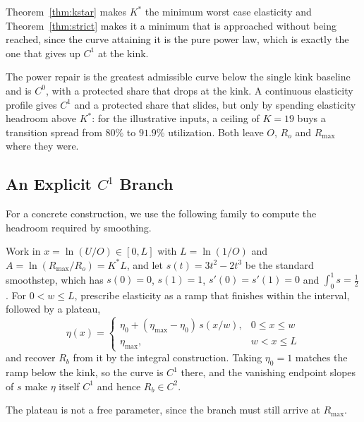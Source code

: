 \documentclass[11pt,a4paper]{article}
\begin{document}
Theorem~\ref{thm:kstar} makes $K^*$ the minimum worst case elasticity and Theorem~\ref{thm:strict} makes it a minimum that is approached without being reached, since the curve attaining it is the pure power law, which is exactly the one that gives up $C^1$ at the kink.

The power repair is the greatest admissible curve below the single kink baseline and is $C^0$, with a protected share that drops at the kink. A continuous elasticity profile gives $C^1$ and a protected share that slides, but only by spending elasticity headroom above $K^*$: for the illustrative inputs, a ceiling of $K=19$ buys a transition spread from $80\%$ to $91.9\%$ utilization. Both leave $O$, $R_o$ and $R_{\max}$ where they were.

\subsection{An Explicit \texorpdfstring{$C^1$}{C1} Branch}
\label{app:smoothstep}

For a concrete construction, we use the following family to compute the headroom required by smoothing.

Work in $x=\ln(U/O)\in[0,L]$ with $L=\ln(1/O)$ and $A=\ln(R_{\max}/R_o)=K^*L$, and let $s(t)=3t^2-2t^3$ be the standard smoothstep, which has $s(0)=0$, $s(1)=1$, $s'(0)=s'(1)=0$ and $\int_0^1 s=\tfrac12$. For $0<w\leq L$, prescribe elasticity as a ramp that finishes within the interval, followed by a plateau,
\begin{equation}
\boxed{
\eta(x)=
\begin{cases}
\eta_0+(\eta_{\max}-\eta_0)\,s(x/w), & 0\leq x\leq w\\[3pt]
\eta_{\max}, & w<x\leq L
\end{cases}
}
\end{equation}
and recover $R_b$ from it by the integral construction. Taking $\eta_0=1$ matches the ramp below the kink, so the curve is $C^1$ there, and the vanishing endpoint slopes of $s$ make $\eta$ itself $C^1$ and hence $R_b\in C^2$.

The plateau is not a free parameter, since the branch must still arrive at $R_{\max}$.
\end{document}
